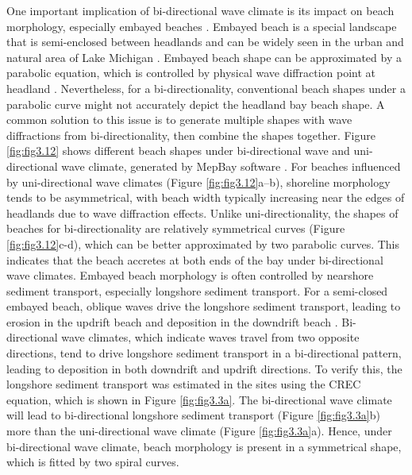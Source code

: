 One important implication of bi-directional wave climate is its impact on beach
morphology, especially embayed beaches
\citep{wiggins_coastal_2019,wiggins_regionally-coherent_2019}. Embayed beach is
a special landscape that is semi-enclosed between headlands and can be widely
seen in the urban and natural area of Lake Michigan \citep{mattheus_great_2022}.
Embayed beach shape can be approximated by a parabolic equation, which is
controlled by physical wave diffraction point at headland
\citep{moreno_equilibrium_1999}. Nevertheless, for a bi-directionality,
conventional beach shapes under a parabolic curve might not accurately depict
the headland bay beach shape. A common solution to this issue is to generate
multiple shapes with wave diffractions from bi-directionality, then combine the
shapes together. Figure \ref{fig:fig3.12} shows different beach shapes under
bi-directional wave and uni-directional wave climate, generated by MepBay
software \citep{da2003visual}. For beaches influenced by uni-directional wave
climates (Figure \ref{fig:fig3.12}a–b), shoreline morphology tends to be
asymmetrical, with beach width typically increasing near the edges of headlands
due to wave diffraction effects. Unlike uni-directionality, the shapes of
beaches for bi-directionality are relatively symmetrical curves (Figure
\ref{fig:fig3.12}c-d), which can be better approximated by two parabolic
curves. This indicates that the beach accretes at both ends of the bay under
bi-directional wave climates. Embayed beach morphology is often controlled by
nearshore sediment transport, especially longshore sediment transport. For a
semi-closed embayed beach, oblique waves drive the longshore sediment transport,
leading to erosion in the updrift beach and deposition in the downdrift beach
\citep{moreno_equilibrium_1999,loureiro_24_2020}. Bi-directional wave climates,
which indicate waves travel from two opposite directions, tend to drive
longshore sediment transport in a bi-directional pattern, leading to deposition
in both downdrift and updrift directions. To verify this, the longshore sediment
transport was estimated in the sites using the CREC equation, which is shown in
Figure \ref{fig:fig3.3a}. The bi-directional wave climate will lead to
bi-directional longshore sediment transport (\eg Figure \ref{fig:fig3.3a}b)
more than the uni-directional wave climate (\eg Figure \ref{fig:fig3.3a}a).
Hence, under bi-directional wave climate, beach morphology is present in a
symmetrical shape, which is fitted by two spiral curves. 

